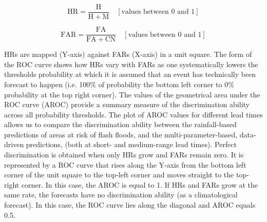 \begin{equation}
\mathrm{HR} = \frac{\mathrm{H}}{\mathrm{H} + \mathrm{M}}\quad[\text{values between }0\text{ and }1]
\label{eq:hr}
\end{equation}

\begin{equation}
\mathrm{FAR} = \frac{\mathrm{FA}}{\mathrm{FA} + \mathrm{CN}}\quad[\text{values between }0\text{ and }1]
\label{eq:far}
\end{equation}

HRs are mapped (Y-axis) against FARs (X-axis) in a unit square. The form of the ROC curve shows how HRs vary with FARs as one systematically lowers the thresholds probability at which it is assumed that an event has technically been forecast to happen (i.e. 100\% of probability the bottom left corner to 0\% probability at the top right corner). The values of the geometrical area under the ROC curve (AROC) provide a summary measure of the discrimination ability across all probability thresholds. The plot of AROC values for different lead times allows us to compare the discrimination ability between the rainfall-based predictions of areas at risk of flash floods, and the multi-parameter-based, data-driven predictions, (both at short- and medium-range lead times). Perfect discrimination is obtained when only HRs grow and FARs remain zero. It is represented by a ROC curve that rises along the Y-axis from the bottom left corner of the unit square to the top-left corner and moves straight to the top-right corner. In this case, the AROC is equal to 1. If HRs and FARs grow at the same rate, the forecasts have no discrimination ability (as a climatological forecast). In this case, the ROC curve lies along the diagonal and AROC equals 0.5. 


